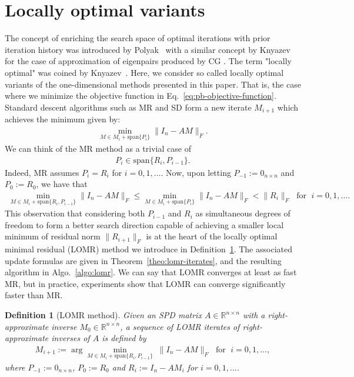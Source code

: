 \documentclass[numbers,webpdf,imanum]{ima-authoring-template}%
\theoremstyle{thmstyletwo}%
\newtheorem{definition}{Definition}
\numberwithin{equation}{section}
\begin{document}
\section{Locally optimal variants}\label{sec:lo-variants}
The concept of enriching the search space of optimal iterations with prior iteration history was introduced by Polyak~\cite{polyak_methods_1964} with a similar concept by Knyazev~\cite{knyazev2001toward} for the case of approximation of eigenpairs produced by CG \cite{knyazev1991preconditioned}.
The term "locally optimal" was coined by Knyazev~\cite{knyazev2001toward}.
Here, we consider so called locally optimal variants of the one-dimensional methods presented in this paper.
That is, the case where we minimize the objective function in Eq.~\eqref{eq:pb-objective-function}.
Standard descent algorithms such as MR and SD form a new iterate $M_{i+1}$ which achieves the minimum given by:
\begin{align}\label{eq:600}
\min_{M\in M_i+\text{span}\{P_i\}}\|I_n-AM\|_F.
\end{align}
We can think of the MR method as a trivial case of
\begin{align}\label{eq:602}
P_i\in\text{span}\{R_i,P_{i-1}\}.
\end{align}
Indeed, MR assumes $P_i=R_i$ for $i=0,1,\dots$.
Now, upon letting $P_{-1}:=0_{n\times n}$ and $P_0:=R_0$, we have that 
\begin{align}\label{eq:605}
\min_{M\in M_i+\text{span}\{R_i,P_{i-1}\}}\|I_n-AM\|_F
\leq
\min_{M\in M_i+\text{span}\{P_i\}}\|I_n-AM\|_F
<\|R_i\|_F
\;\text{ for }\;
i=0,1,\dots.
\end{align}
This observation that considering both $P_{i-1}$ and $R_i$ as simultaneous degrees of freedom to form a better search direction capable of achieving a smaller local minimum of residual norm $\|R_{i+1}\|_F$ is at the heart of the locally optimal minimal residual (LOMR) method we introduce in Definition~\ref{def:lomr}. 
The associated update formulas are given in Theorem~\ref{theo:lomr-iterates}, and the resulting algorithm in Algo.~\ref{algo:lomr}.
We can say that LOMR converges at least as fast MR, but in practice, experiments show that LOMR can converge significantly faster than MR.

\begin{definition}[LOMR method]\label{def:lomr}
Given an SPD matrix $A\in\mathbb{R}^{n\times n}$ with a right-approximate inverse $M_0\in\mathbb{R}^{n\times n}$, a sequence of LOMR iterates of right-approximate inverses of $A$ is defined by
\begin{align}\label{eq:610}
M_{i+1}:=
\arg\underset{M\in M_i+\text{span}\{R_i,P_{i-1}\}}{\min}\;
\|I_n-AM\|_F
\;\text{ for }\;
i=0,1,\dots,
\end{align}
where $P_{-1}:=0_{n\times n}$, $P_0:=R_0$ and $R_i:=I_n-AM_i$ for $i=0,1,\dots$.
\end{definition}
\end{document}
